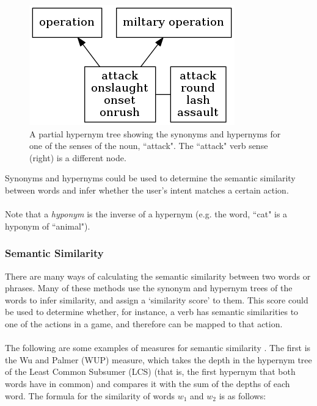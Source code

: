 \documentclass[11pt]{article}
\begin{document}
\begin{center}
\begin{figure}[H]
\begin{center}
  \includegraphics[scale=1]{hypernym-tree.png}
  \caption{A partial hypernym tree showing the synonyms and hypernyms for one of the senses of the noun, ``attack". The ``attack" verb sense (right) is a different node.}
  \end{center}
\end{figure}
\end{center}

Synonyms and hypernyms could be used to determine the semantic similarity between words and infer whether the user's intent matches a certain action.
\\
\\
Note that a \textit{hyponym} is the inverse of a hypernym (e.g. the word, ``cat" is a hyponym of ``animal").

\subsubsection{Semantic Similarity}
\label{section:bg-semantic-sim}

There are many ways of calculating the semantic similarity between two words or phrases. Many of these methods use the synonym and hypernym trees of the words to infer similarity, and assign a `similarity score' to them. This score could be used to determine whether, for instance, a verb has semantic similarities to one of the actions in a game, and therefore can be mapped to that action.
\\
\\
The following are some examples of measures for semantic similarity \cite{RefWorks:46}. The first is the Wu and Palmer (WUP) measure, which takes the depth in the hypernym tree of the Least Common Subsumer (LCS) (that is, the first hypernym that both words have in common) and compares it with the sum of the depths of each word. The formula for the similarity of words $w_1$ and $w_2$ is as follows:
\end{document}
